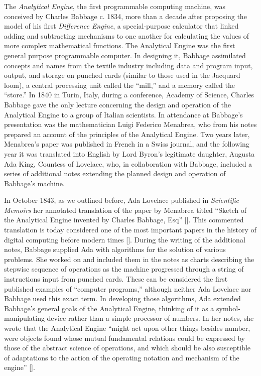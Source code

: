 {{{The \textit{Analytical Engine}, the first programmable computing machine, was conceived by Charles Babbage c. 1834, more than a decade after proposing the model of his first \textit{Difference Engine}, a special-purpose calculator that linked adding and subtracting mechanisms to one another for calculating the values of more complex mathematical functions. The  Analytical Engine was the first general purpose programmable computer. In designing it, Babbage assimilated concepts and names from the textile industry including data and program input, output, and storage on punched cards (similar to those used in the Jacquard loom), a central processing unit called the ``mill,'' and a memory called the ``store.'' In 1840 in Turin, Italy, during a conference, Academy of Science, Charles Babbage gave the only lecture concerning the design and operation of the Analytical Engine to a group of Italian scientists. In attendance at Babbage's presentation was the mathematician Luigi Federico Menabrea, who from his notes prepared an account of the principles of the Analytical Engine. Two years later, Menabrea's paper was published in French in a Swiss journal, and the following year it was translated into English by Lord Byron's legitimate daughter, Augusta Ada King, Countess of Lovelace, who, in collaboration with Babbage, included a series of additional notes extending the planned design and operation of Babbage's machine.

In October 1843, as we outlined before, Ada Lovelace published in \textit{Scientific Memoirs} her annotated translation of the paper by Menabrea titled ``Sketch of the Analytical Engine invented by Charles Babbage, Esq'' [\mbox{\citealt{chap:01:Menabrea:1843}}]. This commented translation is today considered one of the most important papers in the history of digital computing before modern times [\citealt{chap:01:Bromley:1984}]. During the writing of the additional notes, Babbage supplied Ada with algorithms for the solution of various problems. She worked on and included them in the notes as charts describing the stepwise sequence of operations as the machine progressed through a string of instructions input from punched cards. These can be considered the first published examples of ``computer programs,'' although neither Ada Lovelace nor Babbage used this exact term. In developing those algorithms, Ada extended Babbage's general goals of the Analytical Engine, thinking of it as a symbol-manipulating device rather than a simple processor of numbers. In her notes, she wrote that the Analytical Engine ``might act upon other things besides number, were objects found whose mutual fundamental relations could be expressed by those of the abstract science of operations, and which should be also susceptible of adaptations to the action of the operating notation and mechanism of the engine'' [\citealt{chap:01:Toole:1998}].


}}}
